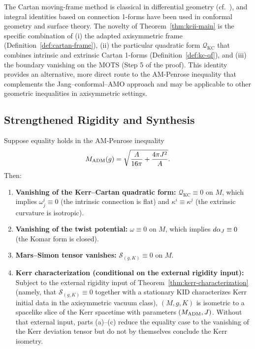 \begin{remark}
The Cartan moving-frame method is classical in differential geometry (cf.\ \cite{cartan1946, chavel1984}), and integral identities based on connection 1-forms have been used in conformal geometry and surface theory. The novelty of Theorem~\ref{thm:kcii-main} is the specific combination of (i) the adapted axisymmetric frame (Definition~\ref{def:cartan-frame}), (ii) the particular quadratic form $\mathcal{Q}_{\mathrm{KC}}$ that combines intrinsic and extrinsic Cartan 1-forms (Definition~\ref{def:kc-qf}), and (iii) the boundary vanishing on the MOTS (Step 5 of the proof). This identity provides an alternative, more direct route to the AM-Penrose inequality that complements the Jang--conformal--AMO approach and may be applicable to other geometric inequalities in axisymmetric settings.
\end{remark}

\subsection{Strengthened Rigidity and Synthesis}

\begin{theorem}\label{thm:strong-rigidity}
Suppose equality holds in the AM-Penrose inequality
\begin{equation}
M_{\mathrm{ADM}}(g) = \sqrt{\frac{A}{16\pi} + \frac{4\pi J^2}{A}}.
\end{equation}
Then:
\begin{enumerate}[label=\textup{(\alph*)}]
    \item \textbf{Vanishing of the Kerr--Cartan quadratic form:} $\mathcal{Q}_{\mathrm{KC}} \equiv 0$ on $M$, which implies $\omega^i_j \equiv 0$ (the intrinsic connection is flat) and $\kappa^i \equiv \kappa^j$ (the extrinsic curvature is isotropic).
    \item \textbf{Vanishing of the twist potential:} $\omega \equiv 0$ on $M$, which implies $d\alpha_J \equiv 0$ (the Komar form is closed).
    \item \textbf{Mars--Simon tensor vanishes:} $\mathcal{S}_{(g,K)} \equiv 0$ on $M$.
    \item \textbf{Kerr characterization (conditional on the external rigidity input):} Subject to the external rigidity input of Theorem~\ref{thm:kerr-characterization} (namely, that $\mathcal{S}_{(g,K)} \equiv 0$ together with a stationary KID characterizes Kerr initial data in the axisymmetric vacuum class), $(M, g, K)$ is isometric to a spacelike slice of the Kerr spacetime with parameters $(M_{\mathrm{ADM}}, J)$. Without that external input, parts (a)--(c) reduce the equality case to the vanishing of the Kerr deviation tensor but do not by themselves conclude the Kerr isometry.
\end{enumerate}
\end{theorem}

